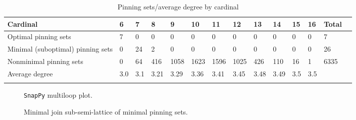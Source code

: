 \documentclass{article}%
\begin{document}
\begin{table}[ht]
	\caption{Pinning sets/average degree by cardinal}
	\centering
	\renewcommand{\arraystretch}{1.5}
	\begin{tabularx}{\textwidth}{lXXXXXXXXXXXXX}
		\toprule
			Cardinal & 6 & 7 & 8 & 9 & 10 & 11 & 12 & 13 & 14 & 15 & 16 & Total\\
			\hline
			Optimal pinning sets & 7 & 0 & 0 & 0 & 0 & 0 & 0 & 0 & 0 & 0 & 0 & 7 \\
			Minimal (suboptimal) pinning sets & 0 & 24 & 2 & 0 & 0 & 0 & 0 & 0 & 0 & 0 & 0 & 26 \\
			Nonminimal pinning sets & 0 & 64 & 416 & 1058 & 1623 & 1596 & 1025 & 426 & 110 & 16 & 1 & 6335 \\
			Average degree & 3.0 & 3.1 & 3.21 & 3.29 & 3.36 & 3.41 & 3.45 & 3.48 & 3.49 & 3.5 & 3.5 &  \\
		\bottomrule \\ 
	\end{tabularx}
\end{table}

\begin{multicols}{2}
\begin{figure}[H]
\centering

\caption{\texttt{SnapPy} multiloop plot.}
\label{fig:tex/img/[[9, 28, 10, 1], [17, 8, 18, 9], [18, 27, 19, 28], [10, 23, 11, 24], [1, 24, 2, 25], [25, 16, 26, 17], [26, 7, 27, 8], [19, 15, 20, 14], [22, 3, 23, 4], [11, 3, 12, 2], [6, 15, 7, 16], [20, 6, 21, 5],.svg}
\end{figure}
\columnbreak

\begin{figure}[H]
\centering
\scalebox{0.8}{}
\caption{Minimal join sub-semi-lattice of minimal pinning sets.}
\label{fig:tex/img/[[9, 28, 10, 1], [17, 8, 18, 9], [18, 27, 19, 28], [10, 23, 11, 24], [1, 24, 2, 25], [25, 16, 26, 17], [26, 7, 27, 8], [19, 15, 20, 14], [22, 3, 23, 4], [11, 3, 12, 2], [6, 15, 7, 16], [20, 6, 21, 5],.pgf}
\end{figure}
\end{multicols}
\end{document}

